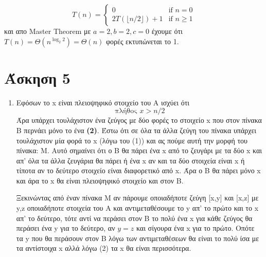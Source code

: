 \documentclass[a4paper,10pt]{article}
\begin{document}
\begin{flushleft}
\begin{enumerate}
        \begin{equation*}
            T(n) = 
            \begin{cases}
            0 & \text{if } n = 0 \\
            2T(\lfloor n/2 \rfloor) + 1 & \text{if } n \geq 1
            \end{cases}
        \end{equation*}
        και απο Master Theorem με $a=2, b=2, c=0$ έχουμε ότι $T(n) = \Theta(n^{\log_2{2}}) = \Theta(n)$ φορές εκτυπώνεται το 1.
    \end{enumerate}

    \newpage
    \section*{Άσκηση 5}
    \begin{enumerate}
        \item Εφόσων το x είναι πλειοψηφικό στοιχείο του Α ισχύει ότι
        \begin{equation}
            \text{πλήθος } x > n/2
        \end{equation}
        Άρα υπάρχει τουλάχιστον ένα ζεύγος με δύο φορές το στοιχείο x που στον πίνακα Β περνάει μόνο το ένα \textbf{(2)}.
        Έστω ότι σε όλα τα άλλα ζεύγη του πίνακα υπάρχει τουλάχιστον μία φορά το x (λόγω του (1)) και ας πούμε αυτή την μορφή του πίνακα: Μ. Αυτό σημαίνει ότι ο Β θα πάρει ένα x από το ζευγάρι με τα δύο x και απ' όλα τα άλλα ζευγάρια θα πάρει ή ένα x αν και τα δύο στοιχεία είναι x ή τίποτα αν το δεύτερο στοιχείο είναι διαφορετικό από x. Άρα ο Β θα πάρει μόνο x και άρα το x θα είναι πλειοψηφικό στοιχείο και στον Β.

        Ξεκινώντας από έναν πίνακα Μ αν πάρουμε οποιαδήποτε ζεύγη [x,y] και [x,z] με y,z οποιαδήποτε στοιχεία του Α και αντιμεταθέσουμε το y απ' το πρώτο και το x απ' το δεύτερο, τότε αντί να περάσει στον Β το πολύ ένα x για κάθε ζεύγος θα περάσει ένα y για το δεύτερο, αν $y=z$ και σίγουρα ένα x για το πρώτο. Οπότε τα y που θα περάσουν στον B λόγω των αντιμεταθέσεων θα είναι το πολύ ίσα με τα αντίστοιχα x αλλά λόγω (2) τα x θα είναι περισσότερα.
    \end{enumerate}
\end{flushleft}
\end{document}
